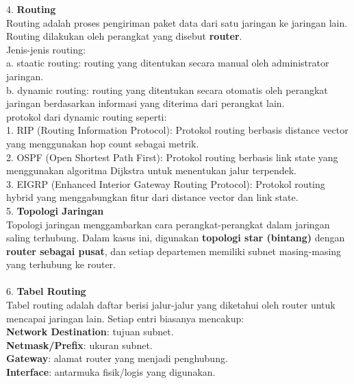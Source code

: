 4. \textbf{Routing}\\
Routing adalah proses pengiriman paket data dari satu jaringan ke jaringan lain. Routing dilakukan oleh perangkat yang disebut \textbf{router}.\\
Jenis-jenis routing:\\
a. staatic routing: routing yang ditentukan secara manual oleh administrator jaringan.\\
b. dynamic routing: routing yang ditentukan secara otomatis oleh perangkat jaringan berdasarkan informasi yang diterima dari perangkat lain.\\
	protokol dari dynamic routing seperti:\\
	1. RIP (Routing Information Protocol): Protokol routing berbasis distance vector yang menggunakan hop count sebagai metrik.\\
	2. OSPF (Open Shortest Path First): Protokol routing berbasis link state yang menggunakan algoritma Dijkstra untuk menentukan jalur terpendek.\\
	3. EIGRP (Enhanced Interior Gateway Routing Protocol): Protokol routing hybrid yang menggabungkan fitur dari distance vector dan link state.\\
5. \textbf{Topologi Jaringan}\\
Topologi jaringan menggambarkan cara perangkat-perangkat dalam jaringan saling terhubung. Dalam kasus ini, digunakan \textbf{topologi star (bintang)} dengan \textbf{router sebagai pusat}, dan setiap departemen memiliki subnet masing-masing yang terhubung ke router.\\\\

6. \textbf{Tabel Routing}\\
Tabel routing adalah daftar berisi jalur-jalur yang diketahui oleh router untuk mencapai jaringan lain. Setiap entri biasanya mencakup:\\
    \textbf{Network Destination}: tujuan subnet.\\
    \textbf{Netmask/Prefix}: ukuran subnet.\\
    \textbf{Gateway}: alamat router yang menjadi penghubung.\\
    \textbf{Interface}: antarmuka fisik/logis yang digunakan.\\

